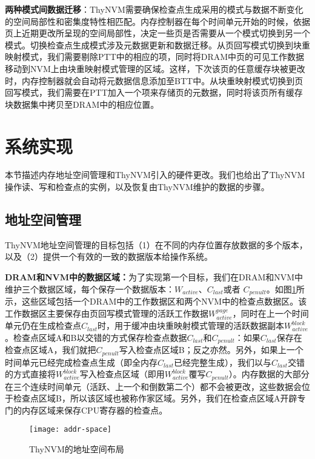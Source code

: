 \textbf{两种模式间数据迁移}：ThyNVM需要确保检查点生成采用的模式与数据不断变化的空间局部性和密集度特性相匹配。内存控制器在每个时间单元开始的时候，依据页上近期更改所呈现的空间局部性，决定一些页是否需要从一个模式切换到另一个模式。切换检查点生成模式涉及元数据更新和数据迁移。从页回写模式切换到块重映射模式，我们需要剔除PTT中的相应的项，同时将DRAM中页的可见工作数据移动到NVM上由块重映射模式管理的区域。这样，下次该页的任意缓存块被更改时，内存控制器就会自动将元数据信息添加至BTT中。从块重映射模式切换到页回写模式，我们需要在PTT加入一个项来存储页的元数据，同时将该页所有缓存块数据集中拷贝至DRAM中的相应位置。

\section{系统实现}
\label{sec:implementation}

本节描述内存地址空间管理和ThyNVM引入的硬件更改。我们也给出了ThyNVM操作读、写和检查点的实例，以及恢复由ThyNVM维护的数据的步骤。

\subsection{地址空间管理}
\label{subsec:thynvm-space}

ThyNVM地址空间管理的目标包括（1）在不同的内存位置存放数据的多个版本，以及（2）提供一个有效的一致的数据版本给操作系统。

\textbf{DRAM和NVM中的数据区域：}为了实现第一个目标，我们在DRAM和NVM中维护三个数据区域，每个保存一个数据版本：$W_{active}$、$C_{last}$或者 $C_{penult}$。如图\ref{fig-addr-space}所示，这些区域包括一个DRAM中的工作数据区和两个NVM中的检查点数据区。该工作数据区主要保存由页回写模式管理的活跃工作数据$W^{page}_{active}$，同时在上一个时间单元仍在生成检查点$C_{last}$时，用于缓冲由块重映射模式管理的活跃数据副本$W^{block}_{active}$。检查点区域A和B以交错的方式保存检查点数据$C_{last}$和$C_{penult}$：如果$C_{last}$保存在检查点区域A，我们就把$C_{penult}$写入检查点区域B；反之亦然。另外，如果上一个时间单元已经完成检查点生成（即全内存$C_{last}$已经完整生成），我们以与$C_{last}$交错的方式直接将$W^{block}_{active}$写入检查点区域（即用$W^{block}_{active}$覆写$C_{penult}$）。内存数据的大部分在三个连续时间单元（活跃、上一个和倒数第二个）都不会被更改，这些数据会位于检查点区域B，所以该区域也被称作家区域。另外，我们在检查点区域A开辟专门的内存区域来保存CPU寄存器的检查点。 

\begin{figure}[!h]
\centering
\texttt{[image: addr-space]}
\caption{ThyNVM的地址空间布局}
\label{fig-addr-space}
\end{figure}

